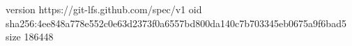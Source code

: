version https://git-lfs.github.com/spec/v1
oid sha256:4ee848a778e552c0e63d2373f0a6557bd800da140c7b703345eb0675a9f6bad5
size 186448
